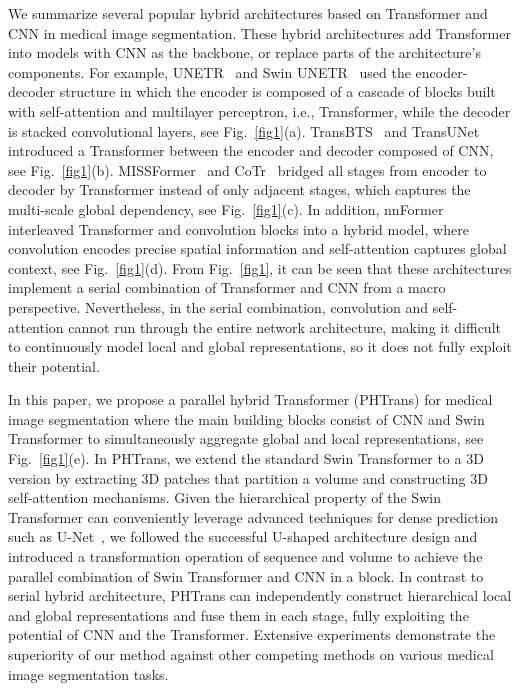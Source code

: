 \documentclass[runningheads]{llncs}
\begin{document}
We summarize several popular hybrid architectures based on Transformer and CNN in medical image segmentation. These hybrid architectures add Transformer into models with CNN as the backbone, or replace parts of the architecture's components. For example, UNETR~\cite{unetr} and Swin UNETR~\cite{swin-unet} used the encoder-decoder structure in which the encoder is composed of a cascade of blocks built with self-attention and multilayer perceptron, i.e., Transformer, while the decoder is stacked convolutional layers, see Fig.~\ref{fig1}(a). TransBTS~\cite{Transbts} and TransUNet~\cite{transunet} introduced a Transformer between the encoder and decoder composed of CNN, see Fig.~\ref{fig1}(b). MISSFormer~\cite{missformer} and CoTr~\cite{cotr} bridged all stages from encoder to decoder by Transformer instead of only adjacent stages, which captures the multi-scale global dependency, see Fig.~\ref{fig1}(c). In addition, nnFormer~\cite{nnformer} interleaved Transformer and convolution blocks into a hybrid model, where convolution encodes precise spatial information and self-attention captures global context, see Fig.~\ref{fig1}(d). From Fig.~\ref{fig1}, it can be seen that these architectures implement a serial combination of Transformer and CNN from a macro perspective. Nevertheless, in the serial combination, convolution and self-attention cannot run through the entire network architecture, making it difficult to continuously model local and global representations, so it does not fully exploit their potential.


In this paper, we propose a parallel hybrid Transformer (PHTrans) for medical image segmentation where the main building blocks consist of CNN and Swin Transformer to simultaneously aggregate global and local representations, see Fig.~\ref{fig1}(e). In PHTrans, we extend the standard Swin Transformer to a 3D version by extracting 3D patches that partition a volume and constructing 3D self-attention mechanisms. Given the hierarchical property of the Swin Transformer can conveniently leverage advanced techniques for dense prediction such as U-Net~\cite{Swin}, we followed the successful U-shaped architecture design and introduced a transformation operation of sequence and volume to achieve the parallel combination of Swin Transformer and CNN in a block. In contrast to serial hybrid architecture, PHTrans can independently construct hierarchical local and global representations and fuse them in each stage, fully exploiting the potential of CNN and the Transformer. Extensive experiments demonstrate the superiority of our method against other competing methods on various medical image segmentation tasks.
\end{document}

